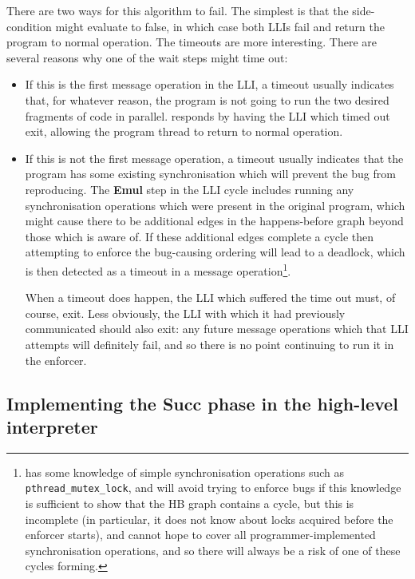 There are two ways for this algorithm to fail.  The simplest is that
the side-condition might evaluate to false, in which case both LLIs
fail and return the program to normal operation.  The timeouts are
more interesting.  There are several reasons why one of the wait steps
might time out:

\begin{itemize}
\item
  If this is the first message operation in the LLI, a timeout usually
  indicates that, for whatever reason, the program is not going to run
  the two desired fragments of code in parallel.  {\Technique}
  responds by having the LLI which timed out exit, allowing the
  program thread to return to normal operation.

\item
  If this is not the first message operation, a timeout usually
  indicates that the program has some existing synchronisation which
  will prevent the bug from reproducing.  The \textbf{Emul} step in
  the LLI cycle includes running any synchronisation operations which
  were present in the original program, which might cause there to be
  additional edges in the happens-before graph beyond those which
  {\technique} is aware of.  If these additional edges complete a
  cycle then attempting to enforce the bug-causing ordering will lead
  to a deadlock, which is then detected as a timeout in a message
  operation\footnote{{\Technique} has some knowledge of simple
    synchronisation operations such as \texttt{pthread\_mutex\_lock},
    and will avoid trying to enforce bugs if this knowledge is
    sufficient to show that the HB graph contains a cycle, but this is
    incomplete (in particular, it does not know about locks acquired
    before the enforcer starts), and cannot hope to cover all
    programmer-implemented synchronisation operations\cite{Xiong2010},
    and so there will always be a risk of one of these cycles
    forming.}.

  When a timeout does happen, the LLI which suffered the time out
  must, of course, exit.  Less obviously, the LLI with which it had
  previously communicated should also exit: any future message
  operations which that LLI attempts will definitely fail, and so
  there is no point continuing to run it in the enforcer.
\end{itemize}


\subsection{Implementing the \textbf{Succ} phase in the high-level interpreter}
\label{sect:enforce:succ}


